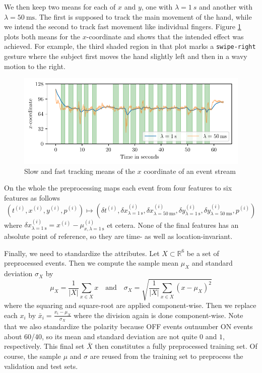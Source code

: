 We then keep two means for each of $x$ and $y$, one with $\lambda = \SI{1}{s}$
and another with $\lambda = \SI{50}{\milli\second}$. The first is supposed to
track the main movement of the hand, while we intend the second to track fast
movement like individual fingers. Figure \ref{fig:ewm-means} plots both means
for the $x$-coordinate and shows that the intended effect was achieved. For
example, the third shaded region in that plot marks a \texttt{swipe-right}
gesture where the subject first moves the hand slightly left and then in a wavy
motion to the right.

\begin{figure}[h]
  \centering
  \includegraphics{figures/dataset/ewm-means}
  \caption{Slow and fast tracking means of the $x$ coordinate of an event stream}
  \label{fig:ewm-means}
\end{figure}

On the whole the preprocessing maps each event from four features to six
features as follows
\begin{equation*}
  \left( t^{(i)}, x^{(i)}, y^{(i)}, p^{(i)} \right) \mapsto \left( \delta t^{(i)}, \delta x_{\lambda = \SI{1}{\second}}^{(i)}, \delta x_{\lambda = \SI{50}{\milli\second}}^{(i)}, \delta y_{\lambda = \SI{1}{\second}}^{(i)}, \delta y_{\lambda = \SI{50}{\milli\second}}^{(i)}, p^{(i)} \right)
\end{equation*}
where $\delta x_{\lambda = \SI{1}{\second}}^{(i)} = x^{(i)} -
\mu_{x,\lambda=\SI{1}{\second}}^{(i)}$ et cetera. None of the final features has
an absolute point of reference, so they are time- as well as location-invariant.

Finally, we need to standardize the attributes. Let $X \subset \mathbb{R}^{6}$
be a set of preprocessed events. Then we compute the sample mean $\mu_{X}$ and
standard deviation $\sigma_{X}$ by
\begin{equation*}
  \mu_{X} = \frac{1}{|X|} \sum_{x \in X} x \quad \textrm{and} \quad \sigma_{X} = \sqrt{\frac{1}{|X|} \sum_{x \in X} \left( x - \mu_{X} \right)^{2}}
\end{equation*}
where the squaring and square-root are applied component-wise. Then we replace
each $x_{i}$ by $\bar{x}_{i} = \frac{x_{i} - \mu_{X}}{\sigma_{X}}$ where the
division again is done component-wise. Note that we also standardize the
polarity because OFF events outnumber ON events about 60/40, so its mean and
standard deviation are not quite $0$ and $1$, respectively. This final set
$\bar{X}$ then constitutes a fully preprocessed training set. Of course, the
sample $\mu$ and $\sigma$ are reused from the training set to preprocess the
validation and test sets.

